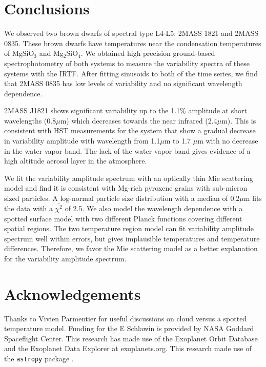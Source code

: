 \documentclass[twocolumn]{aastex6}
\begin{document}
\section{Conclusions}\label{sec:conclusions}

We observed two brown dwarfs of spectral type L4-L5: 2MASS 1821 and 2MASS 0835.
These brown dwarfs have temperatures near the condensation temperatures of MgSiO$_3$ and Mg$_2$SiO$_4$.
We obtained high precision ground-based spectrophotometry of both systems to measure the variability spectra of these systems with the IRTF.
After fitting sinusoids to both of the time series, we find that 2MASS 0835 has low levels of variability and no significant wavelength dependence.

2MASS J1821 shows significant variability up to the 1.1\% amplitude at short wavelengths (0.8$\mu$m) which decreases towards the near infrared (2.4$\mu$m).
This is consistent with HST measurements for the system that show a gradual decrease in variability amplitude with wavelength \citep{yang2016exStormsBD} from 1.1$\mu$m to 1.7 $\mu$m with no decrease in the water vapor band.
The lack of the water vapor band gives evidence of a high altitude aerosol layer in the atmosphere.

We fit the variability amplitude spectrum with an optically thin Mie scattering model and find it is consistent with Mg-rich pyroxene grains with sub-micron sized particles.
A log-normal particle size distribution with a median of 0.2$\mu$m fits the data with a $\bar{\chi^2}$ of 2.5.
We also model the wavelength dependence with a spotted surface model with two different Planck functions covering different spatial regions.
The two temperature region model can fit variability amplitude spectrum well within errors, but gives implausible temperatures and temperature differences.
Therefore, we favor the Mie scattering model as a better explanation for the variability amplitude spectrum.

\section{Acknowledgements}
Thanks to Vivien Parmentier for useful discussions on cloud versus a spotted temperature model.
Funding for the E Schlawin is provided by NASA Goddard Spaceflight Center.
This research has made use of the Exoplanet Orbit Database and the Exoplanet Data Explorer at exoplanets.org.
This research made use of the \texttt{astropy} package \citep{astropy2013}.

\appendix
\end{document}
